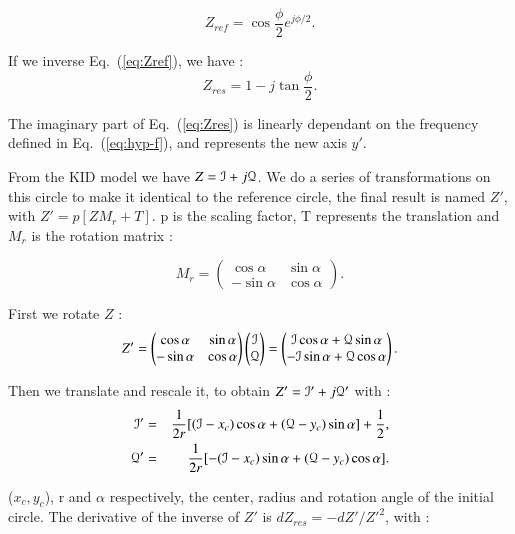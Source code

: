 \begin{equation}
Z_{ref} = \cos \frac{\phi}{2} e^{j \phi/2}.
\label{eq:Zref}
\end{equation}

If we inverse Eq.~(\ref{eq:Zref}), we have : 
\begin{equation}
Z_{res} = 1 - j \tan \frac{\phi}{2}.
\label{eq:Zres}
\end{equation}

The imaginary part of Eq.~(\ref{eq:Zres}) is linearly dependant on the frequency
defined in Eq.~(\ref{eq:hyp-f}), and represents the new axis $y'$.

From the KID model we have $Z=\mathcal{I}+j\mathcal{Q}$. We do a series of transformations on this
circle to make it identical to the reference circle, the final result is named
$Z'$, with $Z'=p[ZM_{r} + T]$. p is the scaling factor, T represents the
translation and $M_{r}$ is the rotation matrix :

\begin{equation}
M_{r} = 
\begin{pmatrix}
	\cos \alpha & \sin \alpha \\
	-\sin \alpha & \cos \alpha
\end{pmatrix} .
\end{equation}


First we rotate $Z$ :
\begin{equation}
Z' = 
\begin{pmatrix}
	\cos \alpha & \sin \alpha \\
	-\sin \alpha & \cos \alpha
\end{pmatrix}
\begin{pmatrix}
	\mathcal{I}\\
	\mathcal{Q}
\end{pmatrix}
=
\begin{pmatrix}
	\mathcal{I}\cos \alpha + \mathcal{Q}\sin \alpha\\
  - \mathcal{I}\sin \alpha + \mathcal{Q}\cos \alpha
\end{pmatrix}.
\end{equation}

Then we translate and rescale it, to obtain $Z'=\mathcal{I}'+j\mathcal{Q}'$ with : 
\begin{eqnarray}
\mathcal{I}' &=& \frac{1}{2r}[(\mathcal{I}-x_{c}) \cos \alpha + (\mathcal{Q} - y_{c}) \sin \alpha] + \frac{1}{2}, \\
\mathcal{Q}' &=& \frac{1}{2r}[-(\mathcal{I}-x_{c}) \sin \alpha + (\mathcal{Q} - y_{c}) \cos \alpha]. \\
\end{eqnarray}

($x_{c}, y_{c}$), r and $\alpha$ respectively, the center, radius and rotation
angle of the initial circle. The derivative of the inverse of $Z'$ is
$dZ_{res}=-dZ'/Z'^{2}$, with :

